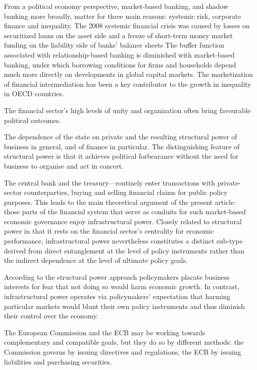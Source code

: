 \documentclass[
]{book}
\begin{document}
From a political economy perspective, market-based banking, and shadow banking more
broadly, matter for three main reasons: systemic risk, corporate finance and inequality.
The 2008 systemic financial crisis was caused by losses on securitized loans on the asset side and
a freeze of short-term money market funding on the liability side of banks' balance sheets
The buffer function associated
with relationship-based banking is diminished with market-based banking,
under which borrowing conditions for firms and households depend much more
directly on developments in global capital markets.
The marketization of financial intermediation has been a key contributor to
the growth in inequality in OECD countries.

The financial sector's high levels of unity and organization often
bring favourable political outcomes.

The dependence of the state on private and the resulting structural power of
business in general, and of finance in particular.
The distinguishing feature of structural power is that it achieves political
forbearance without the need for business to organise and act in concert.

The central bank and the treasury---routinely enter transactions with
private-sector counterparties, buying and selling financial
claims for public policy purposes. This leads to the main theoretical argument of the present
article: those parts of the financial system that serve as conduits for such market-based
economic governance enjoy infrastructural power. Closely related to structural power in that it
rests on the financial sector's centrality for economic performance, infrastructural power
nevertheless constitutes a distinct sub-type derived from direct entanglement at the level of
policy instruments rather than the indirect dependence at the level of ultimate policy goals.

According to the structural power approach policymakers placate business interests
for fear that not doing so would harm economic growth.
In contrast, infrastructural power operates via policymakers' expectation that harming
particular markets would blunt their own policy instruments and thus
diminish their control over the economy.

The European Commission and the ECB may be working towards complementary and
compatible goals, but they do so by different methods: the Commission governs by issuing
directives and regulations, the ECB by issuing liabilities and purchasing securities.
\end{document}
